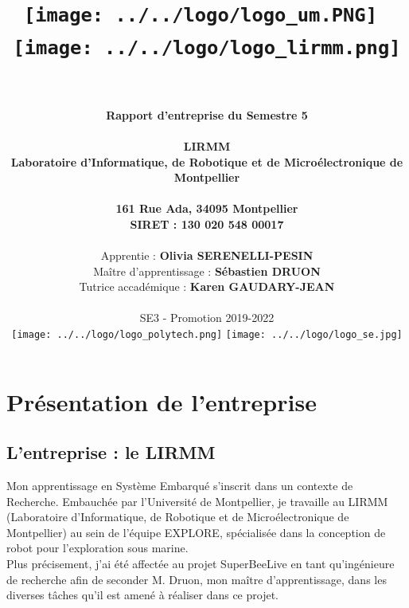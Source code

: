\documentclass[11pt,french,a4paper]{report}
\begin{document}
    \title{
        \texttt{[image: ../../logo/logo\_um.PNG]}\hspace{5cm} 
           \texttt{[image: ../../logo/logo\_lirmm.png]} \\
           \normalsize\textsc{}
           \hfill \\
           }
         
    \author{
        \LARGE{\textbf{Rapport d'entreprise du Semestre 5}} \\\\ 
        \LARGE{\textbf{LIRMM}} \\
           \large{\textbf{Laboratoire d'Informatique, de Robotique et de Microélectronique de Montpellier}} \\ \\
           \large{\textbf{161 Rue Ada, 34095 Montpellier}} \\
           \large{\textbf{SIRET : 130 020 548 00017}} \\ \\
           \large{Apprentie : \textbf{Olivia SERENELLI-PESIN}} \\
           \large{Maître d'apprentissage : \textbf{Sébastien DRUON}} \\
           \large{Tutrice accadémique : \textbf{Karen GAUDARY-JEAN}} \\ \\
           \large{SE3 - Promotion 2019-2022} \vspace*{5\baselineskip}
            \bigskip \\
            \texttt{[image: ../../logo/logo\_polytech.png]}\hspace{7cm}
            \texttt{[image: ../../logo/logo\_se.jpg]}
            \date{}
            }
\maketitle

\clearpage
\newpage 

\tableofcontents

\chapter{Présentation de l'entreprise}

\section{L'entreprise : le LIRMM}

Mon apprentissage en Système Embarqué s'inscrit dans un contexte de Recherche. Embauchée par l'Université 
de Montpellier, je travaille au LIRMM (Laboratoire d'Informatique, de Robotique et de Microélectronique de Montpellier) 
au sein de l'équipe EXPLORE, spécialisée dans la conception de robot pour l'exploration sous marine. \\
Plus précisement, j'ai été affectée au projet SuperBeeLive en tant qu'ingénieure de recherche afin de seconder M. Druon, 
mon maître d'apprentissage, dans les diverses tâches qu'il est amené à réaliser dans ce projet. \\
\end{document}
